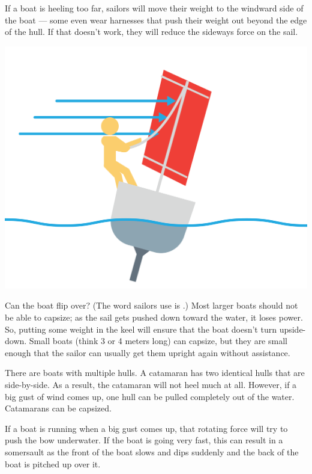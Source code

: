 If a boat is heeling too far,  sailors will move their weight to the windward side of the boat --- some even wear harnesses that push their weight out beyond the edge of the hull.  
If that doesn't work, they will reduce the sideways force on the sail.

\includegraphics[width=.75\textwidth]{heeling2.png}


Can the boat flip over?  (The word sailors use is .)  Most larger boats should not be able to capsize; as the sail gets pushed down toward the water, it loses power.  So, putting some weight in the keel will ensure that the boat doesn't turn upside-down.  Small boats (think 3 or 4 meters long) can capsize,  but they are small enough that the sailor can usually
get them upright again without assistance.

There are boats with multiple hulls. A catamaran has two identical hulls that are side-by-side.  As a result,  the catamaran will not heel much at all.  However,  if a big gust of wind comes up, one hull can be pulled completely out of the water.  Catamarans can be capsized.

If a boat is running when a big gust comes up,  that rotating force will try to push the bow underwater. If the boat is going very fast,  this can result in a somersault as 
the front of the boat slows and dips suddenly and the back of the boat is pitched up over it.



